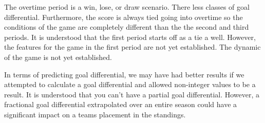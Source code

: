 \documentclass[twocolumn,letterpaper,12pt,notitlepage]{article}
\begin{document}
The overtime period is a win, lose, or draw scenario. There less classes of goal differential. Furthermore, the score is always tied going into overtime so the conditions of the game are completely different than the the second and third periods. It is understood that the first period starts off as a tie a well. However, the features for the game in the first period are not yet established. The dynamic of the game is not yet established. 

In terms of predicting goal differential, we may have had better results if we attempted to calculate a goal differential and allowed non-integer values to be a result.  It is understood that you can't have a partial goal differential. However, a fractional goal differential extrapolated over an entire season could have a significant impact on a teams placement in the standings.
 
\end{document}
